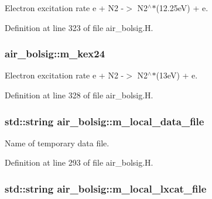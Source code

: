 Electron excitation rate e + N2 -\/$>$ N2$^\wedge$$\ast$(12.\+25eV) + e. 



Definition at line 323 of file air\+\_\+bolsig.\+H.

\subsubsection[{\texorpdfstring{m\+\_\+kex24}{m_kex24}}]{ air\+\_\+bolsig\+::m\+\_\+kex24\hspace{0.3cm}{\ttfamily [protected]}}\hypertarget{classair__bolsig_af2f9493d680a1b101ec46fea917a37a9}{}\label{classair__bolsig_af2f9493d680a1b101ec46fea917a37a9}


Electron excitation rate e + N2 -\/$>$ N2$^\wedge$$\ast$(13eV) + e. 



Definition at line 328 of file air\+\_\+bolsig.\+H.

\subsubsection[{\texorpdfstring{m\+\_\+local\+\_\+data\+\_\+file}{m_local_data_file}}]{\setlength{\rightskip}{0pt plus 5cm}std\+::string air\+\_\+bolsig\+::m\+\_\+local\+\_\+data\+\_\+file\hspace{0.3cm}{\ttfamily [protected]}}\hypertarget{classair__bolsig_aef86376e75796500da5a46ca1264c37b}{}\label{classair__bolsig_aef86376e75796500da5a46ca1264c37b}


Name of temporary data file. 



Definition at line 293 of file air\+\_\+bolsig.\+H.

\subsubsection[{\texorpdfstring{m\+\_\+local\+\_\+lxcat\+\_\+file}{m_local_lxcat_file}}]{\setlength{\rightskip}{0pt plus 5cm}std\+::string air\+\_\+bolsig\+::m\+\_\+local\+\_\+lxcat\+\_\+file\hspace{0.3cm}{\ttfamily [protected]}}\hypertarget{classair__bolsig_a4c853bc283b17d6229090ad3a697e3a3}{}\label{classair__bolsig_a4c853bc283b17d6229090ad3a697e3a3}


